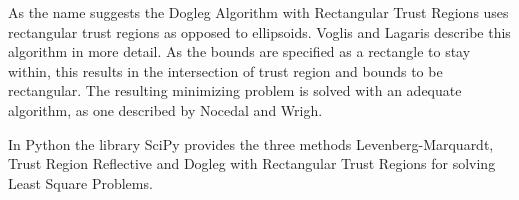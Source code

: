 As the name suggests the Dogleg Algorithm with Rectangular Trust Regions uses\\ rectangular trust regions as opposed to ellipsoids. Voglis and Lagaris describe this algorithm in more detail\cite{voglis2004}. As the bounds are specified as a rectangle to stay within, this results in the intersection of trust region and bounds to be rectangular. The resulting minimizing problem is solved with an adequate algorithm, as one described by Nocedal and Wrigh\cite{Nocedal1999}.

In Python the library SciPy provides the three methods Levenberg-Marquardt, Trust Region Reflective and Dogleg with Rectangular Trust Regions for solving Least Square Problems.